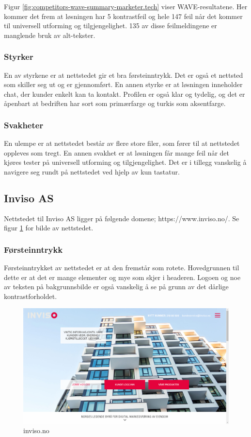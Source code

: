 Figur \ref{fig:competitors-wave-summary-marketer.tech} viser WAVE-resultatene. Her kommer det frem at løsningen har 5 kontrastfeil og hele 147 feil når det kommer til universell utforming og tilgjengelighet. 135 av disse feilmeldingene er manglende bruk av alt-tekster.

\subsubsection{Styrker}
En av styrkene er at nettstedet gir et bra førsteinntrykk. Det er også et nettsted som skiller seg ut og er gjennomført. En annen styrke er at løsningen inneholder chat, der kunder enkelt kan ta kontakt. Profilen er også klar og tydelig, og det er åpenbart at bedriften har sort som primærfarge og turkis som aksentfarge.

\subsubsection{Svakheter}
En ulempe er at nettstedet består av flere store filer, som fører til at nettstedet oppleves som tregt. En annen svakhet er at løsningen får mange feil når det kjøres tester på universell utforming og tilgjengelighet. Det er i tillegg vanskelig å navigere seg rundt på nettstedet ved hjelp av kun tastatur.


\subsection{Inviso AS}
Nettstedet til Inviso AS ligger på følgende domene;
https://www.inviso.no/. Se figur \ref{fig:competitors-inviso.no} for bilde av nettstedet.

\subsubsection{Førsteinntrykk}
Førsteinntrykket av nettstedet er at den fremstår som rotete. Hovedgrunnen til dette er at det er mange elementer og mye som skjer i headeren. Logoen og noe av teksten på bakgrunnsbilde er også vanskelig å se på grunn av det dårlige kontrastforholdet. 

\begin{figure}[H]
    \centering
    \includegraphics[width=\textwidth]{line/inviso_no_(1366x768).png}
    \caption{inviso.no}
    \label{fig:competitors-inviso.no}
\end{figure}

